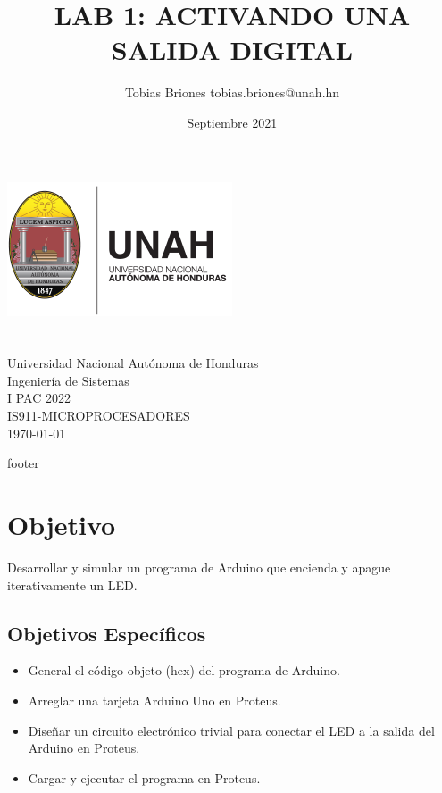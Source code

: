 \documentclass{article}
\title{LAB 1: ACTIVANDO UNA SALIDA DIGITAL}
\author{Tobias Briones \bigbreak tobias.briones@unah.hn}
\date{Septiembre 2021}
\begin{document}
    \makeatletter
    \begin{titlepage}
        \begin{center}
            \includegraphics[width=0.3\linewidth]{images/logo-unah}\\[4ex]
            {\huge \bfseries \@title
            \vspace{1cm}}\\[2ex]
            {\LARGE \@author}\\[50ex]

            {\large
            Universidad Nacional Autónoma de Honduras\\
            Ingeniería de Sistemas\\
            I PAC 2022\\
            IS911-MICROPROCESADORES
            }\\[2ex]

            {\large \today}
        \end{center}
    \end{titlepage}
    \makeatother
    \thispagestyle{empty}
    \newpage

    {footer}

    \section{Objetivo}\label{sec:objetivo}

    Desarrollar y simular un programa de Arduino que encienda y apague
    iterativamente un LED.

    \subsection{Objetivos Específicos}\label{subsec:objetivos-específicos}

    \begin{itemize}
        \item General el código objeto (hex) del programa de Arduino.
        \item Arreglar una tarjeta Arduino Uno en Proteus.
        \item Diseñar un circuito electrónico trivial para conectar el LED a
        la salida del Arduino en Proteus.
        \item Cargar y ejecutar el programa en Proteus.
    \end{itemize}
\end{document}
